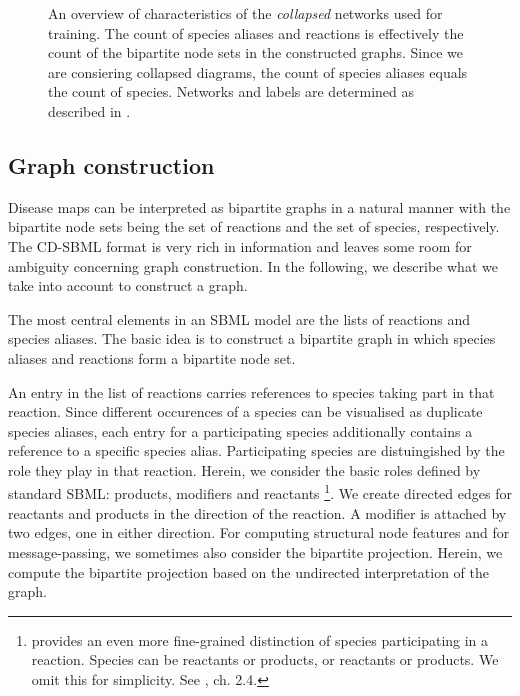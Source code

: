 \documentclass[
	fontsize=10pt, %
	twoside=false, %
	secnumdepth=1, %
]{kaobook}
\begin{document}
\begin{figure}[h]
\begin{subfigure}{0.32\textwidth}
  \end{subfigure} 
  \caption[
  An overview of characteristics of networks used for training.
  ]{ An overview of characteristics of the \textit{collapsed} networks
    used for training. The count of species aliases and reactions is effectively
    the count of the bipartite node sets in the constructed graphs. Since we are
    consiering collapsed diagrams, the count of species aliases equals the count
    of species.
    Networks and labels are determined as described in
    . }
  \label{fig:maps-summary}
\end{figure}







\subsection{Graph construction}
\label{sec:graph-interpretation}
Disease maps can be interpreted as bipartite graphs in a natural manner with the
bipartite node sets being the set of reactions and the set of species,
respectively. The CD-SBML format is very rich in information and leaves
some room for ambiguity concerning graph construction. In the following, we
describe what we take into account to construct a graph.

The most central elements in an SBML model are the lists of reactions and
species aliases. The basic idea is to construct a bipartite graph in which
species aliases and reactions form a bipartite node set.

An entry in the list of reactions carries references to species taking part in
that reaction. Since different occurences of a species can be visualised as
duplicate species aliases, each entry for a participating species additionally
contains a reference to a specific species alias. Participating species are
distuingished by the role they play in that reaction. Herein, we consider the
basic roles defined by standard SBML: products, modifiers and reactants
\footnote{  provides an even more fine-grained
  distinction of species participating in a reaction. Species can be 
  reactants or products,  or  reactants or
  products. We omit this for simplicity. See
  \cite{_CellDesignerExtensionTag_2010}, ch. 2.4.
}. We create directed edges for reactants and products in the
direction of the reaction. A modifier is attached by two edges, one in either
direction. For computing structural node features and for message-passing, we
sometimes also consider the
bipartite projection. Herein, we compute the bipartite projection based on the
undirected interpretation of the graph.
\end{document}
